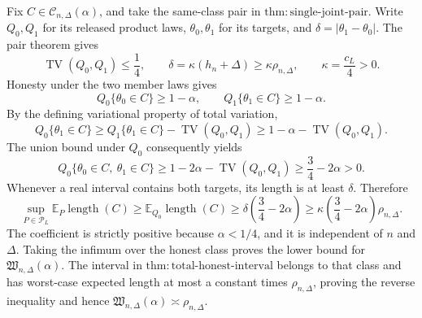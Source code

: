 Fix \(C\in\mathcal C_{n,\Delta}(\alpha)\), and take the same-class pair in \(\mathrm{thm:single\text{-}joint\text{-}pair}\).  Write \(Q_0,Q_1\) for its released product laws, \(\theta_0,\theta_1\) for its targets, and \(\delta=|\theta_1-\theta_0|\).  The pair theorem gives
\[
 \operatorname{TV}(Q_0,Q_1)\le\frac14,
 \qquad
 \delta=\kappa(h_n+\Delta)\ge\kappa\rho_{n,\Delta},
 \qquad \kappa=\frac{c_L}{4}>0.
\]
Honesty under the two member laws gives
\[
 Q_0\{\theta_0\in C\}\ge1-\alpha,
 \qquad
 Q_1\{\theta_1\in C\}\ge1-\alpha.
\]
By the defining variational property of total variation,
\[
 Q_0\{\theta_1\in C\}
 \ge Q_1\{\theta_1\in C\}-\operatorname{TV}(Q_0,Q_1)
 \ge1-\alpha-\operatorname{TV}(Q_0,Q_1).
\]
The union bound under \(Q_0\) consequently yields
\[
 Q_0\{\theta_0\in C,\ \theta_1\in C\}
 \ge1-2\alpha-\operatorname{TV}(Q_0,Q_1)
 \ge\frac34-2\alpha>0.
\]
Whenever a real interval contains both targets, its length is at least \(\delta\).  Therefore
\[
 \sup_{P\in\mathcal P_L}\mathbb E_P\operatorname{length}(C)
 \ge\mathbb E_{Q_0}\operatorname{length}(C)
 \ge\delta\left(\frac34-2\alpha\right)
 \ge\kappa\left(\frac34-2\alpha\right)\rho_{n,\Delta}.
\]
The coefficient is strictly positive because \(\alpha<1/4\), and it is independent of \(n\) and \(\Delta\).  Taking the infimum over the honest class proves the lower bound for \(\mathfrak W_{n,\Delta}(\alpha)\).  The interval in \(\mathrm{thm:total\text{-}honest\text{-}interval}\) belongs to that class and has worst-case expected length at most a constant times \(\rho_{n,\Delta}\), proving the reverse inequality and hence \(\mathfrak W_{n,\Delta}(\alpha)\asymp\rho_{n,\Delta}\).